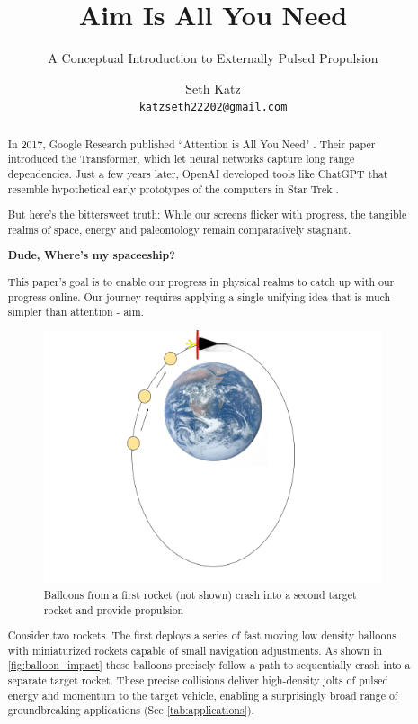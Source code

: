 \documentclass{article}
\title{Aim Is All You Need}
\subtitle{A Conceptual Introduction to Externally Pulsed Propulsion}
\author{
  Seth Katz \\
  \texttt{katzseth22202@gmail.com} \\
}
\begin{document}
\maketitle

\begin{abstract}\label{sec:abstract}
 In 2017, Google Research published ``Attention is All You Need" \cite{vaswani2023attentionneed}.  Their paper introduced the Transformer, which let neural networks capture long range dependencies.   Just a few years later, OpenAI developed tools like ChatGPT \cite{chatgpt} that resemble hypothetical early prototypes of the computers in Star Trek \cite{startrek}.

But here's the bittersweet truth:  While our screens flicker with progress, the tangible realms of space, energy and paleontology remain comparatively stagnant.

\textbf{Dude, Where's my spaceeship?}

This paper's goal is to enable our progress in physical realms to catch up with our progress online.  Our journey requires applying a single unifying idea that is much simpler than attention - aim.   \begin{figure}[htpb]
    \centering
    \includegraphics[width=0.5\linewidth]{images/Starship_Impact_ellipse.png}
    \caption{Balloons from a first rocket (not shown) crash into a second target rocket and provide propulsion \cite{earth_image}}
    \label{fig:balloon_impact}
\end{figure}

Consider two rockets.   The first deploys a series of fast moving low density balloons with miniaturized rockets capable of small navigation adjustments.  As shown in \autoref{fig:balloon_impact} these balloons precisely follow a path to sequentially crash  into a separate  target rocket.   These precise collisions deliver high-density jolts of pulsed energy and momentum to the target vehicle, enabling a surprisingly broad range of groundbreaking applications (See \autoref{tab:applications}).    


\end{abstract}
\end{document}
